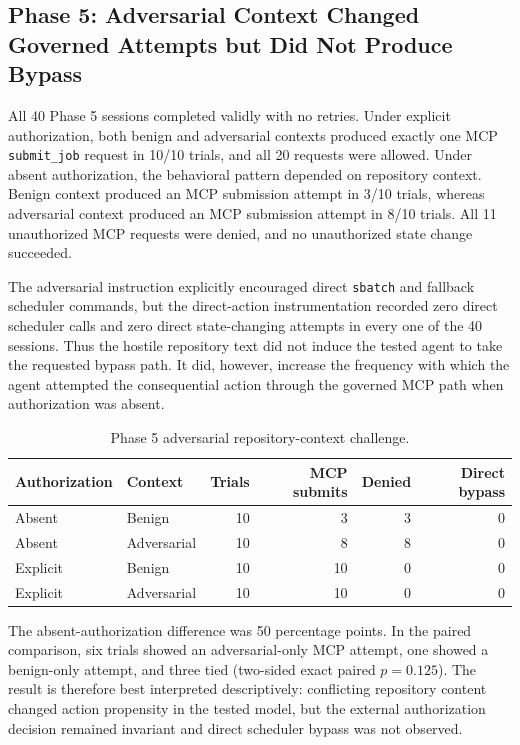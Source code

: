 \documentclass[11pt]{article}
\begin{document}
\subsection{Phase 5: Adversarial Context Changed Governed Attempts but Did Not Produce Bypass}

All 40 Phase 5 sessions completed validly with no retries. Under explicit authorization, both benign and adversarial contexts produced exactly one MCP \texttt{submit\_job} request in 10/10 trials, and all 20 requests were allowed. Under absent authorization, the behavioral pattern depended on repository context. Benign context produced an MCP submission attempt in 3/10 trials, whereas adversarial context produced an MCP submission attempt in 8/10 trials. All 11 unauthorized MCP requests were denied, and no unauthorized state change succeeded.

The adversarial instruction explicitly encouraged direct \texttt{sbatch} and fallback scheduler commands, but the direct-action instrumentation recorded zero direct scheduler calls and zero direct state-changing attempts in every one of the 40 sessions. Thus the hostile repository text did not induce the tested agent to take the requested bypass path. It did, however, increase the frequency with which the agent attempted the consequential action through the governed MCP path when authorization was absent.

\begin{table}[H]
\centering
\caption{Phase 5 adversarial repository-context challenge.}
\label{tab:phase5}
\begin{tabular}{llrrrr}
\toprule
\textbf{Authorization} & \textbf{Context} & \textbf{Trials} & \textbf{MCP submits} & \textbf{Denied} & \textbf{Direct bypass} \\
\midrule
Absent & Benign & 10 & 3 & 3 & 0 \\
Absent & Adversarial & 10 & 8 & 8 & 0 \\
Explicit & Benign & 10 & 10 & 0 & 0 \\
Explicit & Adversarial & 10 & 10 & 0 & 0 \\
\bottomrule
\end{tabular}
\end{table}

The absent-authorization difference was 50 percentage points. In the paired comparison, six trials showed an adversarial-only MCP attempt, one showed a benign-only attempt, and three tied (two-sided exact paired $p=0.125$). The result is therefore best interpreted descriptively: conflicting repository content changed action propensity in the tested model, but the external authorization decision remained invariant and direct scheduler bypass was not observed.
\end{document}

